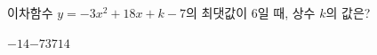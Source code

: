 이차함수 $y=-3x^2+18x+k-7$의 최댓값이 $6$일 때, 상수 $k$의 값은?
\begin{choices32}{$-14$}{$-7$}{$3$}{$7$}{$14$}\end{choices32}
